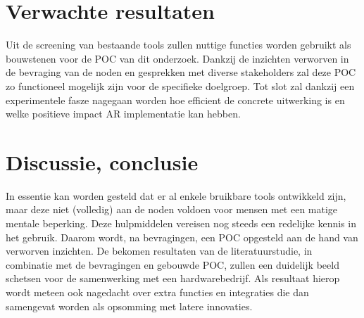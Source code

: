 \documentclass{hogent-article}
\begin{document}
    \section{Verwachte resultaten}%
    \label{sec:verwachte-resultaten}
    
    
    Uit de screening van bestaande tools zullen nuttige functies worden gebruikt als bouwstenen voor de POC van dit onderzoek. Dankzij de inzichten verworven in de bevraging van de noden en gesprekken met diverse stakeholders zal deze POC zo functioneel mogelijk zijn voor de specifieke doelgroep. Tot slot zal dankzij een experimentele fasze nagegaan worden hoe efficient de concrete uitwerking is en welke positieve impact AR implementatie kan hebben.
    
    
    \section{Discussie, conclusie}%
    \label{sec:discussie-conclusie}
    In essentie kan worden gesteld dat er al enkele bruikbare tools ontwikkeld zijn, maar deze niet (volledig) aan de noden voldoen voor mensen met een matige mentale beperking. Deze hulpmiddelen vereisen nog steeds een redelijke kennis in het gebruik. Daarom wordt, na bevragingen, een POC opgesteld aan de hand van verworven inzichten. De bekomen resultaten van de literatuurstudie, in combinatie met de bevragingen en gebouwde POC, zullen een duidelijk beeld schetsen voor de samenwerking met een hardwarebedrijf. Als resultaat hierop wordt meteen ook nagedacht over extra functies en integraties die dan samengevat worden als opsomming met latere innovaties.
\end{document}
